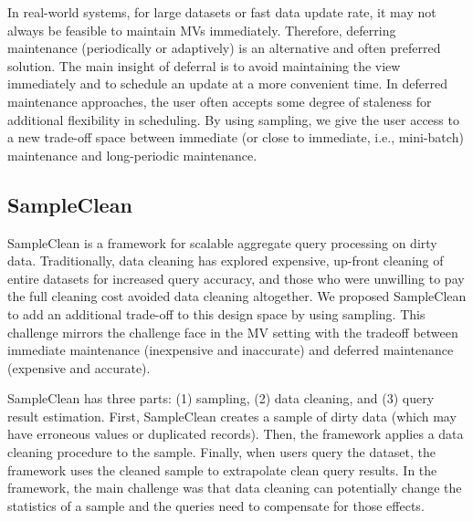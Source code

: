 In real-world systems, for large datasets or fast data update rate, it may not always be feasible to maintain MVs immediately. 
Therefore, deferring maintenance (periodically or adaptively) is an alternative and often preferred solution.
The main insight of deferral is to avoid maintaining the view immediately and to schedule an update at a more convenient time.
In deferred maintenance approaches, the user often accepts some degree of staleness for additional flexibility in scheduling.
By using sampling, we give the user access to a new trade-off space between immediate (or close to immediate, i.e., mini-batch) maintenance and long-periodic maintenance.

\fi


\subsection{SampleClean~\cite{wang1999sample}}
SampleClean is a framework for scalable aggregate query processing on dirty data.
Traditionally, data cleaning has explored expensive, up-front cleaning of entire datasets for increased query accuracy, and those who were unwilling to pay the full cleaning cost avoided data cleaning altogether.
We proposed SampleClean to add an additional trade-off to this design space by using sampling.
This challenge mirrors the challenge face  in the MV setting with the tradeoff between immediate maintenance (inexpensive and inaccurate) and deferred maintenance (expensive and accurate).

SampleClean has three parts: (1) sampling, (2) data cleaning, and (3) query result estimation.
First, SampleClean creates a sample of dirty data (which may have erroneous values or duplicated records). %
Then, the framework applies a data cleaning procedure to the sample.
Finally, when users query the dataset, the framework uses the cleaned sample to extrapolate clean query results.
In the framework, the main challenge was that data cleaning can potentially change the statistics of a sample and the queries need to compensate for those effects.

